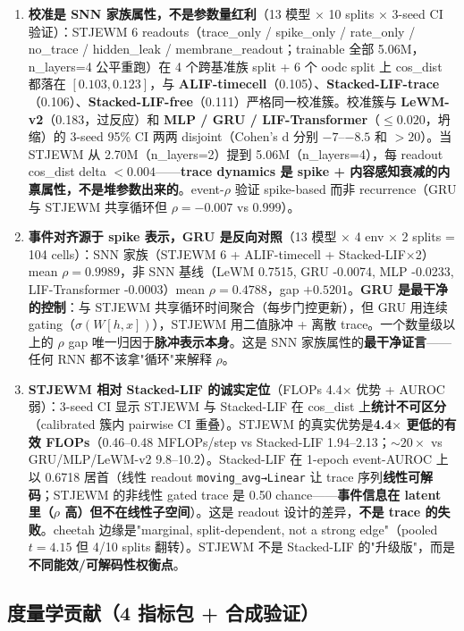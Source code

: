 \documentclass[11pt,a4paper]{article}
\begin{document}
\begin{enumerate}[leftmargin=2em]
    \item \textbf{校准是 SNN 家族属性，不是参数量红利}（13 模型 × 10 splits × 3-seed CI 验证）：STJEWM 6 readouts（trace\_only / spike\_only / rate\_only / no\_trace / hidden\_leak / membrane\_readout；trainable 全部 5.06M，n\_layers=4 公平重跑）在 4 个跨基准族 split + 6 个 oodc split 上 cos\_dist 都落在 $[0.103, 0.123]$，与 \textbf{ALIF-timecell}（0.105）、\textbf{Stacked-LIF-trace}（0.106）、\textbf{Stacked-LIF-free}（0.111）严格同一校准簇。校准簇与 \textbf{LeWM-v2}（0.183，过反应）和 \textbf{MLP / GRU / LIF-Transformer}（$\leq 0.020$，坍缩）的 3-seed 95\% CI 两两 disjoint（Cohen's d 分别 $-7$--$-8.5$ 和 $>20$）。当 STJEWM 从 2.70M（n\_layers=2）提到 5.06M（n\_layers=4），每 readout cos\_dist delta $< 0.004$——\textbf{trace dynamics 是 spike + 内容感知衰减的内禀属性，不是堆参数出来的}。event-$\rho$ 验证 spike-based 而非 recurrence（GRU 与 STJEWM 共享循环但 $\rho=-0.007$ vs $0.999$）。
    \item \textbf{事件对齐源于 spike 表示，GRU 是反向对照}（13 模型 × 4 env × 2 splits = 104 cells）：SNN 家族（STJEWM 6 + ALIF-timecell + Stacked-LIF×2）mean $\rho = 0.9989$，非 SNN 基线（LeWM 0.7515, GRU -0.0074, MLP -0.0233, LIF-Transformer -0.0003）mean $\rho = 0.4788$，gap $+0.5201$。\textbf{GRU 是最干净的控制}：与 STJEWM 共享循环时间聚合（每步门控更新），但 GRU 用连续 gating（$\sigma(W[h, x])$），STJEWM 用二值脉冲 + 离散 trace。一个数量级以上的 $\rho$ gap 唯一归因于\textbf{脉冲表示本身}。这是 SNN 家族属性的\textbf{最干净证言}——任何 RNN 都不该拿"循环"来解释 $\rho$。
    \item \textbf{STJEWM 相对 Stacked-LIF 的诚实定位}（FLOPs 4.4× 优势 + AUROC 弱）：3-seed CI 显示 STJEWM 与 Stacked-LIF 在 cos\_dist 上\textbf{统计不可区分}（calibrated 簇内 pairwise CI 重叠）。STJEWM 的真实优势是\textbf{4.4$\times$ 更低的有效 FLOPs}（0.46--0.48 MFLOPs/step vs Stacked-LIF 1.94--2.13；$\sim 20\times$ vs GRU/MLP/LeWM-v2 9.8--10.2）。Stacked-LIF 在 1-epoch event-AUROC 上以 0.6718 居首（线性 readout \texttt{moving\_avg→Linear} 让 trace 序列\textbf{线性可解码}；STJEWM 的非线性 gated trace 是 0.50 chance——\textbf{事件信息在 latent 里（$\rho$ 高）但不在线性子空间}）。这是 readout 设计的差异，\textbf{不是 trace 的失败}。cheetah 边缘是"marginal, split-dependent, not a strong edge"（pooled $t=4.15$ 但 4/10 splits 翻转）。STJEWM 不是 Stacked-LIF 的"升级版"，而是\textbf{不同能效/可解码性权衡点}。
\end{enumerate}

\subsection{度量学贡献（4 指标包 + 合成验证）}
\end{document}
